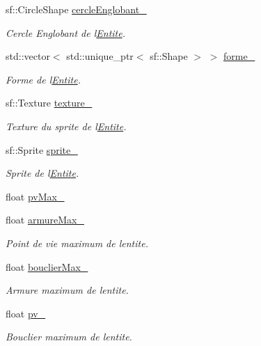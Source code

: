 \begin{DoxyCompactItemize}
sf\+::\+Circle\+Shape \hyperlink{class_entite_a5b6c62e4dc54221a84ce4dc824fdb2da}{cercle\+Englobant\+\_\+}
\begin{DoxyCompactList}\small\item\em Cercle Englobant de l\textquotesingle{}\hyperlink{class_entite}{Entite}. \end{DoxyCompactList}\item 
std\+::vector$<$ std\+::unique\+\_\+ptr$<$ sf\+::\+Shape $>$ $>$ \hyperlink{class_entite_aa6bbda9a40f701f273c344406a6f5122}{forme\+\_\+}
\begin{DoxyCompactList}\small\item\em Forme de l\textquotesingle{}\hyperlink{class_entite}{Entite}. \end{DoxyCompactList}\item 
sf\+::\+Texture \hyperlink{class_entite_a8147b9459318a9b1de1b72dce115680a}{texture\+\_\+}
\begin{DoxyCompactList}\small\item\em Texture du sprite de l\textquotesingle{}\hyperlink{class_entite}{Entite}. \end{DoxyCompactList}\item 
sf\+::\+Sprite \hyperlink{class_entite_ab7c03b6fe5c4f1d08cd3e4304e0ef7c0}{sprite\+\_\+}
\begin{DoxyCompactList}\small\item\em Sprite de l\textquotesingle{}\hyperlink{class_entite}{Entite}. \end{DoxyCompactList}\item 
float \hyperlink{class_entite_a1346c3ad97658a42d327ab4928d6639c}{pv\+Max\+\_\+}
\item 
float \hyperlink{class_entite_a2c5851310f0809f805205f23f443a48b}{armure\+Max\+\_\+}
\begin{DoxyCompactList}\small\item\em Point de vie maximum de l\textquotesingle{}entite. \end{DoxyCompactList}\item 
float \hyperlink{class_entite_a7c48bbfd096baadcb84ce62e31e183d9}{bouclier\+Max\+\_\+}
\begin{DoxyCompactList}\small\item\em Armure maximum de l\textquotesingle{}entite. \end{DoxyCompactList}\item 
float \hyperlink{class_entite_a85b09d98caf443622a546345db8828b8}{pv\+\_\+}
\begin{DoxyCompactList}\small\item\em Bouclier maximum de l\textquotesingle{}entite. \end{DoxyCompactList}\item 

\end{DoxyCompactItemize}
